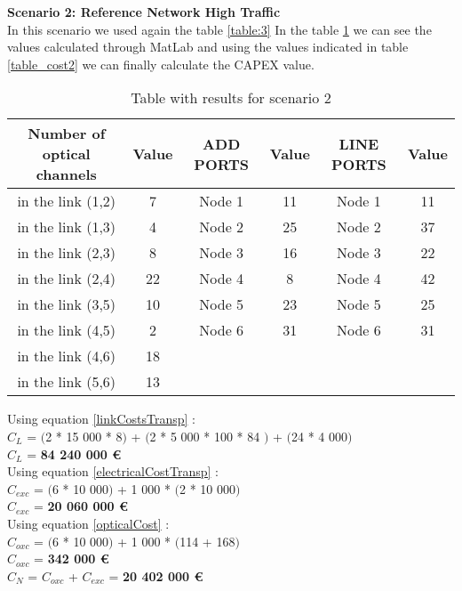 \textbf{Scenario 2: Reference Network High Traffic} \label{Scenario2_transp} \\

In this scenario we used again the table \ref{table:3} In the table \ref{result_ILP2_T} we can see the values calculated through MatLab and using the values indicated in table \ref{table_cost2} we can finally calculate the CAPEX value.

\begin{table}[h!]
\centering
\begin{tabular}{|| c | c || c | c || c | c ||}
 \hline
 Number of optical channels & Value & ADD PORTS & Value & LINE PORTS & Value \\
 \hline\hline
 in the link (1,2) & 7 & Node 1 & 11 & Node 1 & 11 \\
 in the link (1,3) & 4 & Node 2 & 25 & Node 2 & 37 \\
 in the link (2,3) & 8 & Node 3 & 16 & Node 3 & 22 \\
 in the link (2,4) & 22 & Node 4 & 8 & Node 4 & 42 \\
 in the link (3,5) & 10 & Node 5 & 23 & Node 5 & 25 \\
 in the link (4,5) & 2 & Node 6 & 31 & Node 6 & 31 \\
 in the link (4,6) & 18 & & & & \\
 in the link (5,6) & 13 & & & & \\
 \hline
\end{tabular}
\caption{Table with results for scenario 2}
\label{result_ILP2_T}
\end{table}


Using equation \ref{linkCostsTransp} : \\
$C_L$ = $($2 * 15 000 * 8$)$ + $($2 * 5 000 * 100 * 84 $)$ + $($24 * 4 000$)$ \\
$C_L$ = \textbf{84 240 000 \euro} \\

Using equation \ref{electricalCostTransp} : \\
$C_{exc}$ = $($6 * 10 000$)$ + 1 000 * $($2 * 10 000$)$ \\
$C_{exc}$ = \textbf{20 060 000 \euro} \\

Using equation \ref{opticalCost} : \\
$C_{oxc}$ = $($6 * 10 000$)$ + 1 000 * $($114 + 168$)$ \\
$C_{oxc}$ = \textbf{342 000 \euro} \\
$C_N$ = $C_{oxc}$ + $C_{exc}$ = \textbf{20 402 000 \euro} \\

